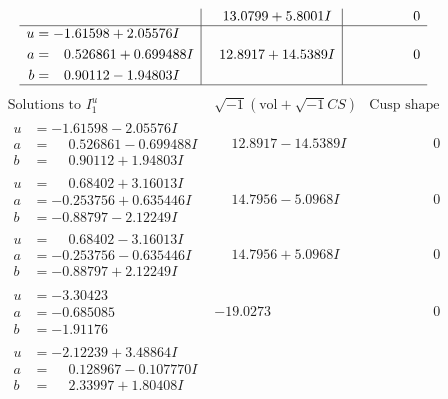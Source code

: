 \documentclass[1p]{elsarticle_modified}
\theoremstyle{definition}
\newcommand{\I}{\sqrt{-1}}
\begin{document}
$$\begin{array}{c|c|c}
 & \phantom{-}13.0799 + 5.8001 I & \phantom{-0.000000 } 0 \\ \hline\begin{aligned}
u &= -1.61598 + 2.05576 I \\
a &= \phantom{-}0.526861 + 0.699488 I \\
b &= \phantom{-}0.90112 - 1.94803 I\end{aligned}
 & \phantom{-}12.8917 + 14.5389 I & \phantom{-0.000000 } 0\\
 \hline 
 \end{array}$$\newpage$$\begin{array}{c|c|c}  
\text{Solutions to }I^u_{1}& \I (\text{vol} + \sqrt{-1}CS) & \text{Cusp shape}\\
 \hline 
\begin{aligned}
u &= -1.61598 - 2.05576 I \\
a &= \phantom{-}0.526861 - 0.699488 I \\
b &= \phantom{-}0.90112 + 1.94803 I\end{aligned}
 & \phantom{-}12.8917 - 14.5389 I & \phantom{-0.000000 } 0 \\ \hline\begin{aligned}
u &= \phantom{-}0.68402 + 3.16013 I \\
a &= -0.253756 + 0.635446 I \\
b &= -0.88797 - 2.12249 I\end{aligned}
 & \phantom{-}14.7956 - 5.0968 I & \phantom{-0.000000 } 0 \\ \hline\begin{aligned}
u &= \phantom{-}0.68402 - 3.16013 I \\
a &= -0.253756 - 0.635446 I \\
b &= -0.88797 + 2.12249 I\end{aligned}
 & \phantom{-}14.7956 + 5.0968 I & \phantom{-0.000000 } 0 \\ \hline\begin{aligned}
u &= -3.30423\phantom{ +0.000000I} \\
a &= -0.685085\phantom{ +0.000000I} \\
b &= -1.91176\phantom{ +0.000000I}\end{aligned}
 & -19.0273\phantom{ +0.000000I} & \phantom{-0.000000 } 0 \\ \hline\begin{aligned}
u &= -2.12239 + 3.48864 I \\
a &= \phantom{-}0.128967 - 0.107770 I \\
b &= \phantom{-}2.33997 + 1.80408 I\end{aligned}

\end{array}$$
\end{document}
